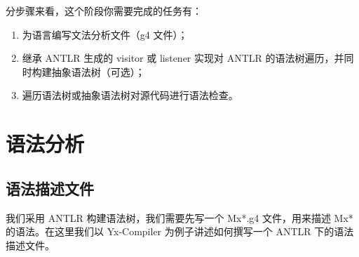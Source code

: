 分步骤来看，这个阶段你需要完成的任务有：
\begin{enumerate}
    \item 为语言编写文法分析文件（g4 文件）；
    \item 继承 ANTLR 生成的 visitor 或 listener 实现对 ANTLR 的语法树遍历，并同时构建抽象语法树（可选）；
    \item 遍历语法树或抽象语法树对源代码进行语法检查。
\end{enumerate}





\section{语法分析}
\subsection{语法描述文件}
我们采用 ANTLR 构建语法树，我们需要先写一个 Mx*.g4 文件，用来描述 Mx* 的语法。在这里我们以 Yx-Compiler\cite{Yx}
为例子讲述如何撰写一个 ANTLR 下的语法描述文件。

